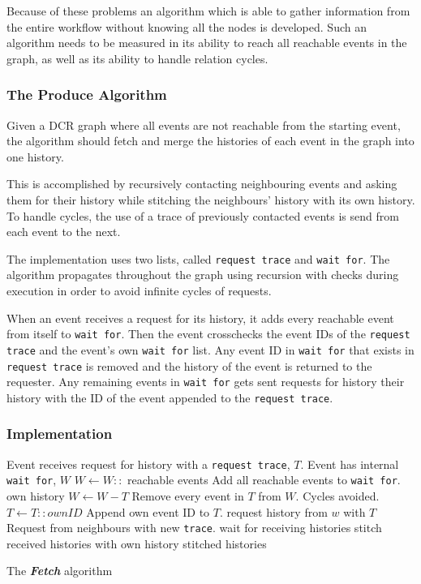 	Because of these problems an algorithm which is able to gather information from the entire workflow without knowing all the nodes is developed. Such an algorithm needs to be measured in its ability to reach all reachable events in the graph, as well as its ability to handle relation cycles. 
	
	\subsubsection{The Produce Algorithm}
	Given a DCR graph where all events are not reachable from the starting event, the algorithm should fetch and merge the histories of each event in the graph into one history.
	
	This is accomplished by recursively contacting neighbouring events and asking them for their history while stitching the neighbours' history with its own history. To handle cycles, the use of a trace of previously contacted events is send from each event to the next.
	
	\newpar The implementation uses two lists, called \texttt{request trace} and \texttt{wait for}.
	The algorithm propagates throughout the graph using recursion with checks during execution in order to avoid infinite cycles of requests. 
	
	When an event receives a request for its history, it adds every reachable event from itself to \texttt{wait for}. Then the event crosschecks the event IDs of the \texttt{request trace} and the event's own \texttt{wait for} list. Any event ID in \texttt{wait for} that exists in \texttt{request trace} is removed and the history of the event is returned to the requester. Any remaining events in \texttt{wait for} gets sent requests for history their history with the ID of the event appended to the \texttt{request trace}. 
	
	\subsubsection{Implementation}
	\begin{algorithm}
	\begin{algorithmic}
		\State Event receives request for history with a \texttt{request trace}, $T$.
		\State Event has internal \texttt{wait for}, $W$
		\State
		\State $W\gets W::$ reachable events \Comment Add all reachable events to \texttt{wait for}.
			\Return own history
		\Else
			\State $W\gets W-T$ \Comment Remove every event in $T$ from $W$. Cycles avoided.
			\State $T\gets T::ownID$ \Comment Append own event ID to $T$.
			\State
				\State request history from $w$ with $T$ \Comment Request from neighbours with new \texttt{trace}.
			\EndFor
			\State wait for receiving histories
			\State stitch received histories with own history
			\State
			\Return stitched histories
		\EndIf
	\end{algorithmic}
	\caption{The \textit{\textbf{Fetch}} algorithm}
	\label{alg:fetch}
	\end{algorithm}
	
